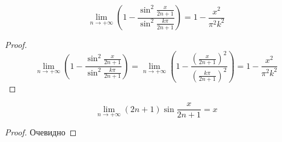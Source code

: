 \documentclass[../main.tex]{subfiles}
\begin{document}
\begin{lemma}
\begin{equation*}
    \lim_{n \to +\infty}\left(1-\frac{\sin^2 \frac{x}{2n+1}}{\sin^2\frac{k\pi}{2n+1}}\right)=
    1-\frac{x^2}{\pi^2 k^2}
\end{equation*}
\begin{proof}
\begin{equation*}
    \lim_{n \to +\infty}\left(1-\frac{\sin^2 \frac{x}{2n+1}}{\sin^2\frac{k\pi}{2n+1}}\right)=
    \lim_{n \to +\infty}\left(1-\frac{\left(\frac{x}{2n+1}\right)^2}{\left(\frac{k\pi}{2n+1}\right)^2}\right)=
    1-\frac{x^2}{\pi^2 k^2}
\end{equation*}
\end{proof}
\end{lemma}

\begin{lemma}
\begin{equation*}
    \lim_{n \to +\infty}(2n+1)\sin\frac{x}{2n+1}=x
\end{equation*}
\begin{proof}
Очевидно
\end{proof}
\end{lemma}
\end{document}
